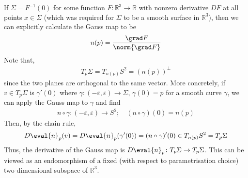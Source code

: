 \begin{remark}
	If $\Sigma = F^{-1}(0)$ for some function $F \colon \mathbb R^3 \to \mathbb R$ with nonzero derivative $DF$ at all points $x \in \Sigma$ (which was required for $\Sigma$ to be a smooth surface in $\mathbb R^3$), then we can explicitly calculate the Gauss map to be
	\begin{align*}
		n(p) = \frac{\grad F}{\norm{\grad F}}
	\end{align*}
	Note that,
	\begin{align*}
		T_p \Sigma = T_{n(p)} S^2 = (n(p))^\perp
	\end{align*}
	since the two planes are orthogonal to the same vector.
	More concretely, if $v \in T_p \Sigma$ is $\gamma'(0)$ where $\gamma \colon (-\varepsilon, \varepsilon) \to \Sigma$, $\gamma(0) = p$ for a smooth curve $\gamma$, we can apply the Gauss map to $\gamma$ and find
	\begin{align*}
		n \circ \gamma \colon (-\varepsilon, \varepsilon) \to S^2;\quad (n \circ \gamma)(0) = n(p)
	\end{align*}
	Then, by the chain rule,
	\begin{align*}
		D\eval{n}_p(v) = D\eval{n}_p(\gamma'(0)) = (n \circ \gamma)'(0) \in T_{n(p)} S^2 = T_p \Sigma
	\end{align*}
	Thus, the derivative of the Gauss map is $D\eval{n}_p \colon T_p \Sigma \to T_p \Sigma$.
	This can be viewed as an endomorphism of a fixed (with respect to parametrisation choice) two-dimensional subspace of $\mathbb R^3$.


\end{remark}
